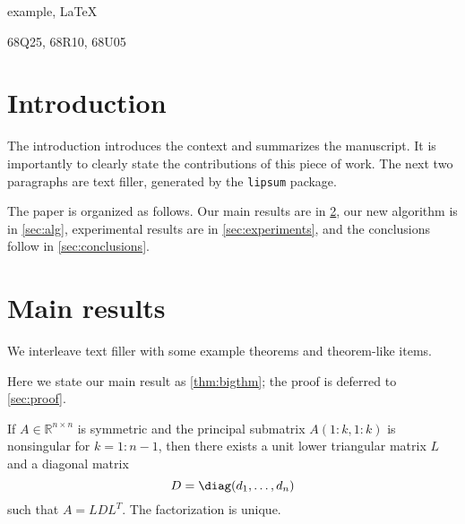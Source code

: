 \documentclass[review]{siamart}
\begin{document}
\maketitle

\begin{abstract}
  This is an example SIAM \LaTeX\ article. This can be used as a
  template for new articles.  Abstracts must be able to stand alone
  and so cannot contain citations to the paper's references,
  equations, etc.  An abstract must consist of a single paragraph and
  be concise. Because of online formatting, abstracts must appear as
  plain as possible. Any equations should be inline.
\end{abstract}

\begin{keywords}
  example, \LaTeX
\end{keywords}

\begin{AMS}
  68Q25, 68R10, 68U05
\end{AMS}

\section{Introduction}
The introduction introduces the context and summarizes the
manuscript. It is importantly to clearly state the contributions of
this piece of work. The next two paragraphs are text filler,
generated by the \texttt{lipsum} package.

\lipsum[2-3]

The paper is organized as follows. Our main results are in
\cref{sec:main}, our new algorithm is in \cref{sec:alg}, experimental
results are in \cref{sec:experiments}, and the conclusions follow in
\cref{sec:conclusions}.

\section{Main results}
\label{sec:main}

We interleave text filler with some example theorems and theorem-like
items.

\lipsum[4]

Here we state our main result as \cref{thm:bigthm}; the proof is
deferred to \cref{sec:proof}.

\begin{theorem}\label{thm:bigthm}
  If $A \in \mathbb{R}^{n \times n}$ is symmetric and the principal
  submatrix $A(1:k,1:k)$ is nonsingular for $k=1:n-1$, then there
  exists a unit lower triangular matrix $L$ and a diagonal matrix
  \begin{displaymath}
    D = \diag(d_1,\dots,d_n)
  \end{displaymath}
  such that $A=LDL^T$. The factorization is unique.
\end{theorem}
\end{document}
